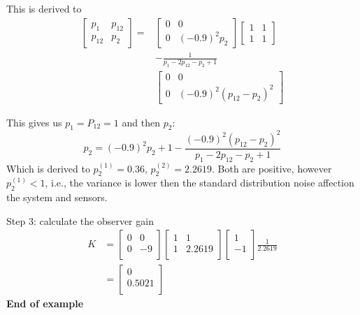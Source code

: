 \begin{multicols}{2}
This is derived to 
\begin{align*}
    \begin{bmatrix} p_{1} & p_{12} \\ p_{12} & p_{2} \end{bmatrix}
    =
    &\begin{bmatrix} 0 & 0 \\ 0 & (-0.9)^2p_2 \end{bmatrix}
    \begin{bmatrix} 1 & 1 \\ 1 & 1 \end{bmatrix}\\
    &-\frac{1}{p_1 -2p_{12} -p_2 +1} \\
    &\begin{bmatrix} 0 & 0 \\ 0 & (-0.9)^2(p_{12}-p_{2})^2 \end{bmatrix}
\end{align*}

This gives us $p_1=P_{12}=1$ and then $p_2$:
\begin{equation*}
    p_2 = (-0.9)^2p_2 + 1 - \frac{(-0.9)^2(p_{12}-p_{2})^2}{p_1 - 2p_{12} -p_2 +1}
\end{equation*}
Which is derived to $p_2^{(1)} = 0.36$, $p_2^{(2)} = 2.2619$.
Both are positive, however $p_2^{(1)}<1$, i.e., the variance is lower then the 
standard distribution noise affection the system and sensors.


Step 3: calculate the observer gain
\begin{align*}
    K &= 
    \begin{bmatrix} 
        0 & 0 \\
        0 & -9 \\
    \end{bmatrix} 
    \begin{bmatrix} 
        1 & 1 \\
        1 & 2.2619 \\
    \end{bmatrix} 
    \begin{bmatrix} 
        1  \\
        -1  \\
    \end{bmatrix} 
    \frac{1}{2.2619} \\
    &= 
    \begin{bmatrix} 
        0 \\
        0.5021 \\
    \end{bmatrix} 
\end{align*}
\textbf{End of example}


\end{multicols}
